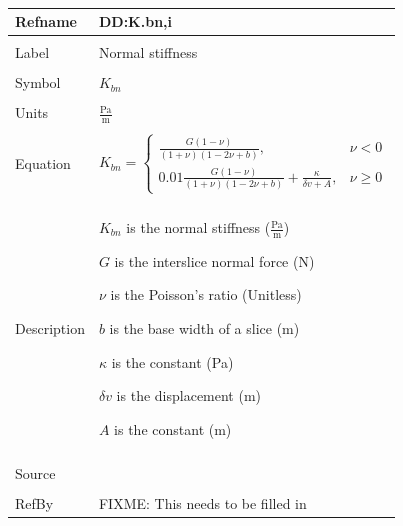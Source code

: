 \documentclass[12pt]{article}
\begin{document}
~\newline
\noindent \begin{minipage}{\textwidth}
\begin{tabular}{p{} p{}}
\toprule \textbf{Refname} & \textbf{DD:K.bn,i}
\label{DD:K.bn,i}
\\ \midrule \\
Label & Normal stiffness
\\ \midrule \\
Symbol & ${K_{bn}}$
\\ \midrule \\
Units & $\frac{\text{Pa}}{\text{m}}$
\\ \midrule \\
Equation & \begin{dmath}
           {K_{bn}}=\begin{cases}
\frac{G \left(1-ν\right)}{\left(1+ν\right) \left(1-2 ν+b\right)}, & ν<0\\
0.01 \frac{G \left(1-ν\right)}{\left(1+ν\right) \left(1-2 ν+b\right)}+\frac{κ}{δv+A}, & ν\geq{}0
\end{cases}
           \end{dmath}
\\ \midrule \\
Description & \begin{symbDescription}
              \item{${K_{bn}}$ is the normal stiffness ($\frac{\text{Pa}}{\text{m}}$)}
              \item{$G$ is the interslice normal force (N)}
              \item{$ν$ is the Poisson's ratio (Unitless)}
              \item{$b$ is the base width of a slice (m)}
              \item{$κ$ is the constant (Pa)}
              \item{$δv$ is the displacement (m)}
              \item{$A$ is the constant (m)}
              \end{symbDescription}
\\ \midrule \\
Source & 
\\ \midrule \\
RefBy & FIXME: This needs to be filled in
\\ \bottomrule \end{tabular}
\end{minipage}\\
\end{document}
